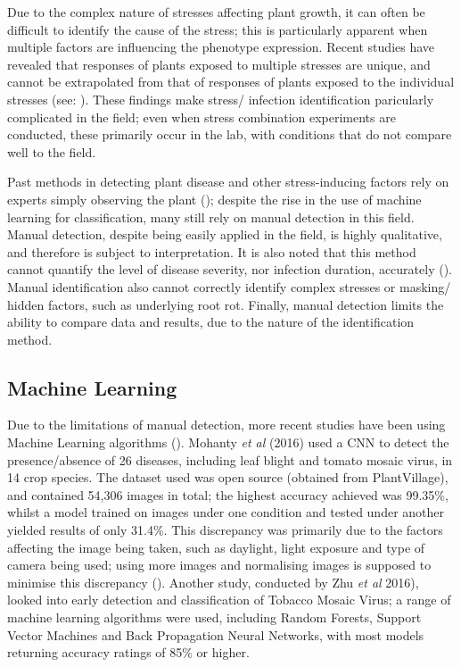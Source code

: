 \documentclass[../../Paper.tex]{subfiles}
\begin{document}
    Due to the complex nature of stresses affecting plant growth, it can often be difficult to identify the cause of the stress; this is particularly apparent when multiple factors are influencing the phenotype expression. Recent studies have revealed that responses of plants exposed to multiple stresses are unique, and cannot be extrapolated from that of responses of plants exposed to the individual stresses (see: \cite{rizhsky_combined_2002, mittler_abiotic_2006}). These findings make stress/ infection identification paricularly complicated in the field; even when stress combination experiments are conducted, these primarily occur in the lab, with conditions that do not compare well to the field.
    
    Past methods in detecting plant disease and other stress-inducing factors
    rely on experts simply observing the plant (\cite{singh_detection_2017}); despite the rise in 
    the use of machine learning for classification, many still rely on manual detection in this field. 
    Manual detection, despite being easily applied in the field, is highly qualitative, and therefore
    is subject to interpretation. It is also noted that this method cannot quantify the level of disease 
    severity, nor infection duration, accurately (\cite{lowe_hyperspectral_2017}). Manual identification also cannot correctly identify complex stresses or masking/ hidden factors, such as underlying root rot. Finally, manual detection
    limits the ability to compare data and results, due to the nature of the identification method. 
    
\subsection*{Machine Learning}    
    Due to the limitations of manual detection, more recent studies have been using Machine
    Learning algorithms (\cite{awate_fruit_2015,baranowski_hyperspectral_2015, mohanty_using_2016,lowe_hyperspectral_2017}). Mohanty \textit{et al} (2016) used a CNN to detect the presence/absence of 26 diseases, including leaf blight and tomato mosaic virus, in 14 crop species. The dataset used was open source (obtained from PlantVillage), and contained 54,306 images in total; the highest accuracy achieved was 99.35\%, whilst a model trained on images under one condition and tested under another yielded results of only 31.4\%. This discrepancy was primarily due to the factors affecting the image being taken, such as daylight, light exposure and type of camera being used; using more images and normalising images is supposed to minimise this discrepancy (\cite{ciresan_multi-column_2012,krizhevsky_imagenet_2012}).
    Another study, conducted by Zhu \textit{et al} 2016), looked into early detection and classification of Tobacco Mosaic Virus; a range of machine learning algorithms were used, including Random Forests, Support Vector Machines and Back Propagation Neural Networks, with most models returning accuracy ratings of 85\% or higher.
    
\end{document}
